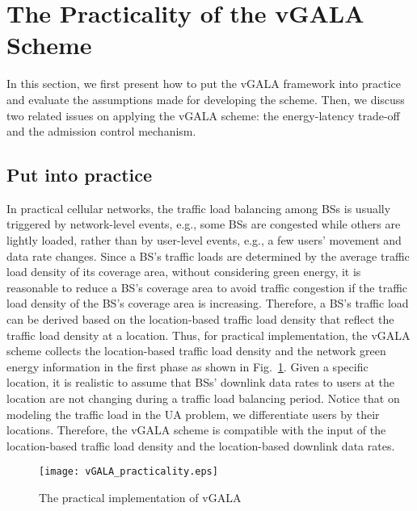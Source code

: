 \documentclass[journal]{IEEEtran}
\theoremstyle{definition}
\begin{document}
\section{The Practicality of the vGALA Scheme}
\label{sec:tradeoff_admission}
In this section, we first present how to put the vGALA framework into practice and evaluate the assumptions made for developing the scheme. Then, we discuss two related issues on applying the vGALA scheme: the energy-latency trade-off and the admission control mechanism.


\subsection{Put into practice}
\label{subsec:put_into_practice}
In practical cellular networks, the traffic load balancing among BSs is usually triggered by network-level events, e.g., some BSs are congested while others are lightly loaded, rather than by user-level events, e.g., a few users' movement and data rate changes. Since a BS's traffic loads are determined by the average traffic load density of its coverage area, without considering green energy, it is reasonable to reduce a BS's coverage area to avoid traffic congestion if the traffic load density of the BS's coverage area is increasing. Therefore, a BS's traffic load can be derived based on the location-based traffic load density that reflect the traffic load density at a location. Thus, for practical implementation, the vGALA scheme collects the location-based traffic load density and the network green energy information in the first phase as shown in Fig.~\ref{fig:vgala_practic}. Given a specific location, it is realistic to assume that BSs' downlink data rates to users at the location are not changing during a traffic load balancing period. Notice that on modeling the traffic load in the UA problem, we differentiate users by their locations. Therefore, the vGALA scheme is compatible with the input of the location-based traffic load density and the location-based downlink data rates.

\begin{figure}
\centering
\texttt{[image: vGALA\_practicality.eps]}
\caption{The practical implementation of vGALA}
\label{fig:vgala_practic}
\vspace{-16pt}
\end{figure}
\end{document}
